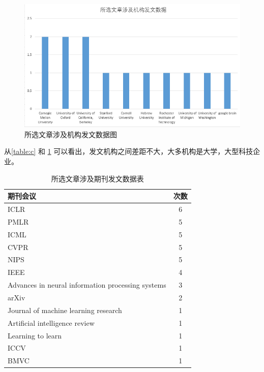     \begin{figure}[htbp]
        \centering
        \includegraphics[width=.7\linewidth]{figure/fc.png}
        \caption{所选文章涉及机构发文数据图}
        \label{fig:fc}
    \end{figure}
    
    从\ref{table:c} 和 \ref{fig:fc} 可以看出，发文机构之间差距不大，大多机构是大学，大型科技企业。

    \begin{table}[htbp]
        \centering
        \begin{tabular}{lc}
        \hline
        \textbf{期刊会议}                                       & \textbf{次数} \\ \hline
        ICLR                                                & 6           \\
        PMLR                                                & 5           \\
        ICML                                                & 5           \\
        CVPR                                                & 5           \\
        NIPS                                                & 5           \\
        IEEE                                                & 4           \\
        Advances in neural information   processing systems & 3           \\
        arXiv                                               & 2           \\
        Journal of machine learning   research              & 1           \\
        Artificial intelligence review                      & 1           \\
        Learning to learn                                   & 1           \\
        ICCV                                                & 1           \\
        BMVC                                                & 1          
        \end{tabular}
        \label{table:d}
        \caption{所选文章涉及期刊发文数据表}
    \end{table}

